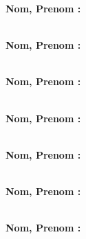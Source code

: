 \documentclass[10pt]{article}
\begin{document}
\begin{multicols}{3}
\textbf{Nom, Prenom : }\\
\fbox\\\vspace{1cm}

\textbf{Nom, Prenom : }\\
\fbox\\\vspace{1cm}

\textbf{Nom, Prenom : }\\
\fbox\\ \vspace{1cm}

\textbf{Nom, Prenom : }\\
\fbox\\\vspace{1cm}

\textbf{Nom, Prenom : }\\
\fbox\\ \vspace{1cm}

\textbf{Nom, Prenom : }\\
\fbox\\\vspace{1cm}

\textbf{Nom, Prenom : }\\
\fbox\\\vspace{1cm}


\end{multicols}
\end{document}

